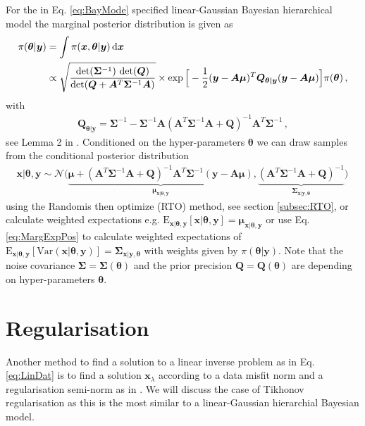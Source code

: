 For the in Eq. \ref{eq:BayMode} specified linear-Gaussian Bayesian hierarchical model the marginal posterior distribution is given as
\begin{align}
	\pi(\bm{\theta} | \bm{y}) &= \int \pi(\bm{x}, \bm{\theta} | \bm{y}) \mathop{}\!\mathrm{d} \bm{x} \\ 
	\label{eq:condHyper}
	&\propto \sqrt{ \frac{ \det( \bm{\Sigma}^{-1} ) \,  \det( \bm{Q}) }{\det( \bm{Q} + \bm{A}^T \bm{\Sigma}^{-1} \bm{A} ) } } \times \exp \Big[ - \frac{1}{2}(\bm{y} -\bm{A \mu})^T \bm{Q}_{\bm{\theta|y}} (\bm{y} -\bm{A \mu}) \Big] \pi(\bm{\theta}) \, ,
\end{align}
with
\begin{align}
	\bm{Q}_{\bm{\theta|y}} = \bm{\Sigma}^{-1} - \bm{\Sigma}^{-1} \bm{A} (\bm{A}^T \bm{\Sigma}^{-1} \bm{A} + \bm{Q} )^{-1} \bm{A}^T \bm{\Sigma}^{-1} \,  ,
\end{align}
see Lemma 2 in \cite{fox2016fast}.
Conditioned on the hyper-parameters $\bm{\theta}$ we can draw samples from the conditional posterior distribution
\begin{align}
	\bm{x}| \bm{\theta}, \bm{y}  \sim \mathcal{N}\big( \underbrace{\bm{\mu} + (\bm{A}^T \bm{\Sigma}^{-1} \bm{A} + \bm{Q} )^{-1} \bm{A}^T \bm{\Sigma}^{-1} (\bm{y} - \bm{A} \bm{\mu})}_{\bm{\mu}_{\bm{x}|  \bm{\theta}, \bm{y}}} , \underbrace{ (\bm{A}^T \bm{\Sigma}^{-1} \bm{A} + \bm{Q} )^{-1}}_{\bm{\Sigma}_{\bm{x}| \bm{y} , \bm{\theta}}} \big) \, 
\end{align}
using the Randomis then optimize (RTO) method, see section \ref{subsec:RTO},
or calculate weighted expectations e.g. $ \text{E}_{\bm{x}|\bm{\theta},\bm{y}} [\bm{x}| \bm{\theta}, \bm{y}] = \bm{\mu}_{\bm{x}| \bm{\theta}, \bm{y} }$ or use Eq. \ref{eq:MargExpPos} to calculate weighted expectations of $\text{E}_{\bm{x}|\bm{\theta},\bm{y}} [\text{Var}(\bm{x}| \bm{\theta}, \bm{y})]  = \bm{\Sigma}_{\bm{x}| \bm{y} , \bm{\theta}}$ with weights given by $\pi(\bm{\theta} | \bm{y} )$.
Note that the noise covariance $\bm{\Sigma}= \bm{\Sigma}( \bm{\theta}) $ and the prior precision $\bm{Q} = \bm{Q}( \bm{\theta})$ are depending on hyper-parameters $\bm{\theta}$.

\section{Regularisation}
Another method to find a solution to a linear inverse problem as in Eq. \ref{eq:LinDat} is to find a solution $\bm{x}_{\lambda}$ according to a data misfit norm and a regularisation semi-norm as in \cite{fox2016fast}.
We will discuss the case of Tikhonov regularisation \cite{kaipio2005statinv,tan2016LecNot} as this is the most similar to a linear-Gaussian hierarchial Bayesian model.

